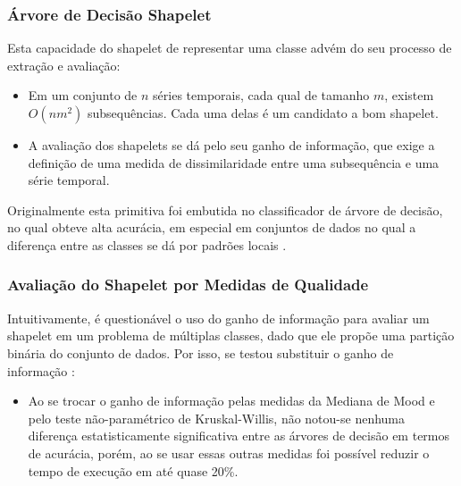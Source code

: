 \documentclass{beamer}
\begin{document}
\begin{frame}
\frametitle{{\'A}rvore de Decis{\~a}o Shapelet}

Esta capacidade do shapelet de representar uma classe adv{\'e}m do seu processo de extra{\c c}{\~a}o e avalia{\c c}{\~a}o:

\begin{itemize}
\item Em um conjunto de $n$ s{\'e}ries temporais, cada qual de tamanho $m$, existem $O(nm^{2})$ subsequ{\^e}ncias. Cada uma delas {\'e} um candidato a bom shapelet.

\item A avalia{\c c}{\~a}o dos shapelets se d{\'a} pelo seu ganho de informa{\c c}{\~a}o, que exige a defini{\c c}{\~a}o de uma medida de dissimilaridade entre uma subsequ{\^e}ncia e uma s{\'e}rie temporal.
\end{itemize}

Originalmente esta primitiva foi embutida no classificador de {\'a}rvore de decis{\~a}o, no qual obteve alta acur{\'a}cia, em especial em conjuntos de dados no qual a diferen{\c c}a entre as classes se d{\'a} por padr{\~o}es locais \cite{Ye:2009do}.
\end{frame}


\begin{frame}
\frametitle{Avalia{\c c}{\~a}o do Shapelet por Medidas de Qualidade}

Intuitivamente, {\'e} question{\'a}vel o uso do ganho de informa{\c c}{\~a}o para avaliar um shapelet em um problema de m{\'u}ltiplas classes, dado que ele prop{\~o}e uma parti{\c c}{\~a}o bin{\'a}ria do conjunto de dados. Por isso, se testou substituir o ganho de informa{\c c}{\~a}o \cite{Lines:2012bv}:

\begin{itemize}
\item Ao se trocar o ganho de informa{\c c}{\~a}o pelas medidas da Mediana de Mood e pelo teste n{\~a}o-param{\'e}trico de Kruskal-Willis, n{\~a}o notou-se nenhuma diferen{\c c}a estatisticamente significativa entre as {\'a}rvores de decis{\~a}o em termos de acur{\'a}cia, por{\'e}m, ao se usar essas outras medidas foi poss{\'i}vel reduzir o tempo de execu{\c c}{\~a}o em at{\'e} quase 20\%.
\end{itemize}
\end{frame}

\end{document}
